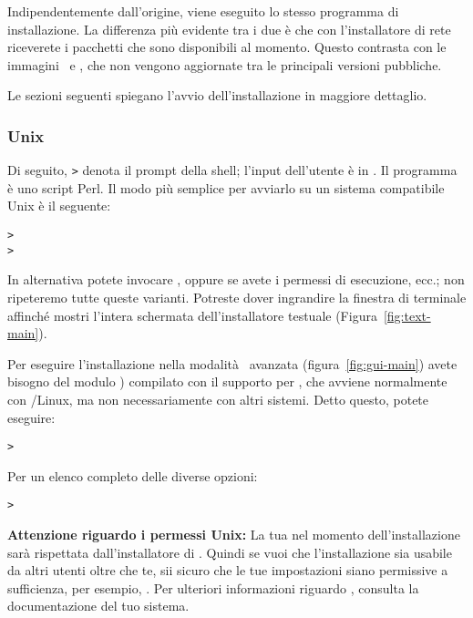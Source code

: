 \documentclass{article}
\begin{document}
Indipendentemente dall'origine, viene eseguito lo stesso programma di
installazione. La differenza più evidente tra i due è che con l'installatore
di rete riceverete i pacchetti che sono disponibili al momento. Questo
contrasta con le immagini \DVD\ e \ISO, che non vengono aggiornate tra le
principali versioni pubbliche.

\noindent
Le sezioni seguenti spiegano l'avvio dell'installazione in maggiore
dettaglio.

\subsubsection{Unix}

Di seguito, \texttt{>} denota il prompt della shell; l'input dell'utente è
in .
Il programma  è uno script Perl. Il modo più semplice
per avviarlo su un sistema compatibile Unix è il seguente:
\begin{alltt}
> 
> 
\end{alltt}
In alternativa potete invocare
, oppure
 se avete i permessi di esecuzione, ecc.; non ripeteremo
tutte queste varianti. Potreste dover ingrandire la finestra di terminale
affinché mostri l'intera schermata dell'installatore testuale
(Figura~\ref{fig:text-main}).

Per eseguire l'installazione nella modalità \GUI\ avanzata
(figura~\ref{fig:gui-main}) avete bisogno del modulo )
compilato con il supporto per , che avviene normalmente con
\GNU/Linux, ma non necessariamente con altri sistemi. Detto questo, potete
eseguire:
\begin{alltt}
> 
\end{alltt}

Per un elenco completo delle diverse opzioni:
\begin{alltt}
> 
\end{alltt}

\textbf{Attenzione riguardo i permessi Unix:} La tua  nel
momento dell'installazione sarà rispettata dall'installatore di \TL{}.
Quindi se vuoi che l'installazione sia usabile da altri utenti oltre che
te, sii sicuro che le tue impostazioni siano permissive a sufficienza, per
esempio, . Per ulteriori informazioni riguardo
, consulta la documentazione del tuo sistema.
\end{document}
